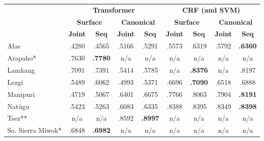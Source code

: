 \begin{table}[!tb]
    \centering
    \begin{tabular}{l|cc|cc|cc|cc}
          & \multicolumn{4}{c|}{\textbf{Transformer}} & \multicolumn{4}{c}{\textbf{CRF (and SVM)}} 
          \\
          & \multicolumn{2}{c|}{\textbf{Surface}} & \multicolumn{2}{c|}{\textbf{Canonical}}  & \multicolumn{2}{c|}{\textbf{Surface}} & \multicolumn{2}{c}{\textbf{Canonical}} 
          \\
          &  \textbf{Joint} & \textbf{Seq} &  \textbf{Joint} & \textbf{Seq} &  \textbf{Joint} & \textbf{Seq} &  \textbf{Joint} & \textbf{Seq} \\
         \hline
         Alas & .4280 & .4565 & .5166 & .5291 
              & .5573 & .6319 & .5792 & \textbf{.6360} \\
         \hline
         Arapaho* & .7630 & \textbf{.7780} & n/a & n/a 
                 & n/a & n/a & n/a & n/a  \\
         \hline
         Lamkang & .7091 & .7391 & .5414 & .5785 
         & n/a & \textbf{.8376} & n/a & .8197 \\
         \hline
         Lezgi  & .5489 & .6062 & .4993 & .5371 
                & .6696 & \textbf{.7090} & .6518 & .6888 \\
         \hline
         Manipuri & .4719 & .5067 & .6401 & .6675 
                  & .7766 & .8063 & .7904 & \textbf{.8191} \\
         \hline
         Natügu & .5423 & .5263 & .6083 & .6335 
                & .8388 & .8395 & .8349 & \textbf{.8398} \\
         \hline
         Tsez** & n/a & n/a & .8592 & \textbf{.8997} 
              & n/a & n/a & n/a & n/a \\
         \hline
         So. Sierra Miwok* & .6848 & \textbf{.6982} & n/a & n/a 
                          & n/a & n/a & n/a & n/a \\

\end{tabular}
\end{table}
